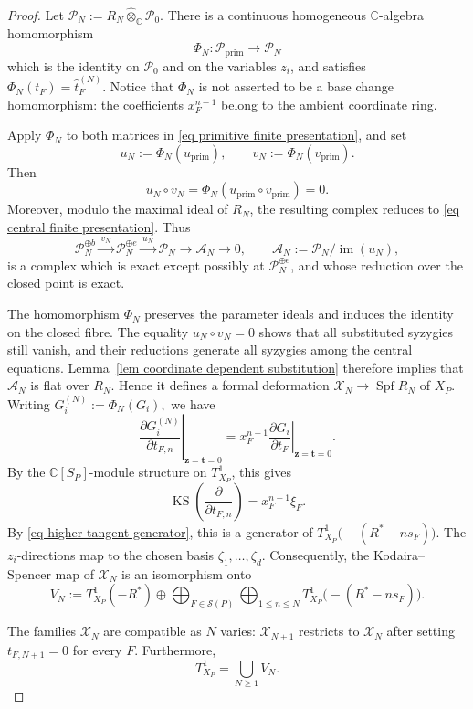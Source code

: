 \documentclass[11pt]{amsart}
\numberwithin{equation}{section}
\theoremstyle{plain}
\theoremstyle{definition}
\newcommand{\0}{$0$-mutable}
\newcommand{\CC}{\ensuremath{\mathbb{C}}}
\renewcommand{\1}{$1$-rigid}
\renewcommand{\0}{$0$-mutable}
\newcommand{\KS}{\operatorname{KS}}
\begin{document}
\begin{proof}
Let
$
\mathcal P_N
:=
R_N\widehat\otimes_{\CC}\mathcal P_0.
$
There is a continuous homogeneous \(\CC\)-algebra homomorphism
\[
\Phi_N\colon
\mathcal P_{\mathrm{prim}}
\longrightarrow
\mathcal P_N
\]
which is the identity on \(\mathcal P_0\) and on the variables \(z_i\),
and satisfies
$
\Phi_N(t_F)=\widehat t_F^{(N)}.
$
Notice that \(\Phi_N\) is not asserted to be a base change
homomorphism: the coefficients \(x_F^{n-1}\) belong to the ambient
coordinate ring.

Apply \(\Phi_N\) to both matrices in
\eqref{eq primitive finite presentation}, and set
\[
u_N:=\Phi_N(u_{\mathrm{prim}}),
\qquad
v_N:=\Phi_N(v_{\mathrm{prim}}).
\]
Then
\[
u_N\circ v_N
=
\Phi_N(u_{\mathrm{prim}}\circ v_{\mathrm{prim}})
=
0.
\]
Moreover, modulo the maximal ideal of \(R_N\), the resulting complex
reduces to \eqref{eq central finite presentation}. Thus
\[
\mathcal P_N^{\oplus b}
\xrightarrow{\,v_N\,}
\mathcal P_N^{\oplus e}
\xrightarrow{\,u_N\,}
\mathcal P_N
\longrightarrow
\mathcal A_N
\longrightarrow0,
\qquad
\mathcal A_N:=\mathcal P_N/\operatorname{im}(u_N),
\]
is a complex which is exact except possibly at
\(\mathcal P_N^{\oplus e}\), and whose reduction over the closed point
is exact.




The homomorphism \(\Phi_N\) preserves the parameter ideals and induces
the identity on the closed fibre. The equality
\(u_N\circ v_N=0\) shows that all substituted syzygies still vanish,
and their reductions generate all syzygies among the central equations.
Lemma~\ref{lem coordinate dependent substitution} therefore implies
that \(\mathcal A_N\) is flat over \(R_N\). Hence it defines a formal
deformation
$
\mathcal X_N\longrightarrow\operatorname{Spf}R_N
$
of \(X_P\). 
Writing
$
G_i^{(N)}:=\Phi_N(G_i),
$
we have
\[
\left.
\frac{\partial G_i^{(N)}}{\partial t_{F,n}}
\right|_{\mathbf z=\mathbf t=0}
=
x_F^{n-1}
\left.
\frac{\partial G_i}{\partial t_F}
\right|_{\mathbf z=\mathbf t=0}.
\]
By the \(\CC[S_P]\)-module structure on \(T^1_{X_P}\), this gives
\[
\KS\left(\frac{\partial}{\partial t_{F,n}}\right)
=
x_F^{n-1}\xi_F.
\]
By \eqref{eq higher tangent generator}, this is a generator of
$
T^1_{X_P}\bigl(-(R^*-ns_F)\bigr).
$
The \(z_i\)-directions map to the chosen basis
\(\zeta_1,\ldots,\zeta_d\). Consequently, the Kodaira--Spencer map of
\(\mathcal X_N\) is an isomorphism onto
\[
V_N
:=
T^1_{X_P}(-R^*)
\oplus
\bigoplus_{F\in\mathcal S(P)}
\bigoplus_{1\leq n\leq N}
T^1_{X_P}\bigl(-(R^*-ns_F)\bigr).
\]

The families \(\mathcal X_N\) are compatible as \(N\) varies:
\(\mathcal X_{N+1}\) restricts to \(\mathcal X_N\) after setting
$
t_{F,N+1}=0
$
for every \(F\). Furthermore,
\[
T^1_{X_P}
=
\bigcup_{N\geq1}V_N.
\]


\end{proof}
\end{document}
